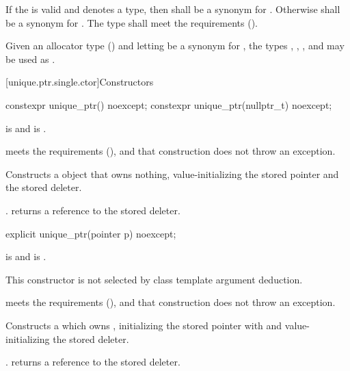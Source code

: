 \pnum
If the   is valid and denotes a
type, then  shall be a synonym for . Otherwise
 shall be a synonym for . The type  shall
meet the  requirements ().

\pnum
\begin{example}
Given an allocator type  () and
letting  be a synonym for , the types ,
, , and 
may be used as .
\end{example}

[unique.ptr.single.ctor]{Constructors}

%
\begin{itemdecl}
constexpr unique_ptr() noexcept;
constexpr unique_ptr(nullptr_t) noexcept;
\end{itemdecl}

\begin{itemdescr}
\pnum
\constraints
{} is  and
 is .

\pnum
\expects
{} meets the  requirements (),
and that construction does not throw an exception.

\pnum
\effects
Constructs a  object that owns
nothing, value-initializing the stored pointer and the stored deleter.

\pnum
\ensures
{}. 
returns a reference to the stored deleter.
\end{itemdescr}

%
\begin{itemdecl}
explicit unique_ptr(pointer p) noexcept;
\end{itemdecl}

\begin{itemdescr}
\pnum
\constraints
{} is  and
 is .

\pnum
\mandates
This constructor is not selected by
class template argument deduction.

\pnum
\expects
{} meets the  requirements (),
and that construction does not throw an exception.

\pnum
\effects
Constructs a  which owns
, initializing the stored pointer with  and
value-initializing the stored deleter.

\pnum
\ensures
{}. 
returns a reference to the stored deleter.
\end{itemdescr}

